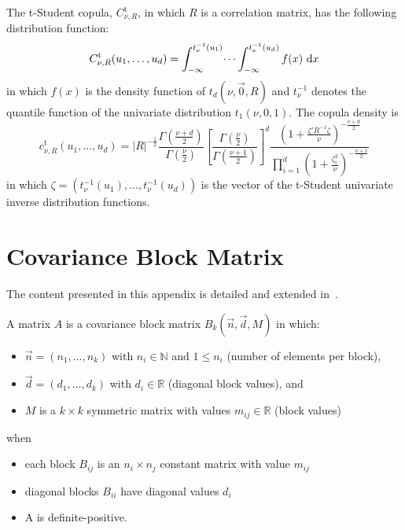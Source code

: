 \documentclass[11pt,fleqn]{book} %
\begin{document}
\begin{proposition}
	The t-Student copula, $C_{\nu,R}^{\text{t}}$, in which $R$ is a 
	correlation matrix, has the following distribution function:
	\begin{displaymath}
		C_{\nu,R}^{\text{t}}(u_1, \dots, u_d) = 
		\int_{-\infty}^{t_\nu^{-1}(u_1)} \dots \int_{-\infty}^{t_\nu^{-1}(u_d)} f(x) \mathop{\,\mathrm{{}d}}\mathopen{} x
	\end{displaymath}
	in which $f(x)$ is the density function of $t_d(\nu,\vec{0},R)$ and 
	$t_{\nu}^{-1}$ denotes the quantile function of the univariate distribution 
	$t_1(\nu,0,1)$. The copula density is
	\begin{displaymath}
		\label{eq:density}
		c_{\nu,R}^{\text{t}}(u_1,\dots,u_d) =
		|R|^{-\frac{1}{2}} 
		\displaystyle\frac{\Gamma{\left(\frac{\nu+d}{2}\right)}}{\Gamma{\left(\frac{\nu}{2}\right)}}
		\displaystyle\left[ \frac{\Gamma{\left(\frac{\nu}{2}\right)}}{\Gamma{\left(\frac{\nu+1}{2}\right)}} \right]^d
		\frac{\displaystyle\left( 1+\frac{\zeta' R^{-1} \zeta}{\nu}\right)^{-\frac{\nu+d}{2}}}{\displaystyle\prod_{i=1}^d \left( 1+\frac{\zeta_i^2}{\nu} \right)^{-\frac{\nu+1}{2}}}
	\end{displaymath}
	\noindent
	in which $\zeta=(t_\nu^{-1}(u_1), \dots, t_\nu^{-1}(u_d))$ is the vector 
	of the t-Student univariate inverse distribution functions.
\end{proposition}

\section{Covariance Block Matrix}
\label{ap:cbm}

The content presented in this appendix is detailed and extended 
in~\cite{torrent:2011}.

\begin{definition}
	A matrix $A$ is a covariance block matrix $B_k(\vec{n},\vec{d},M)$
	in which:
	\begin{itemize}
		\item $\vec{n}=(n_1,\dots,n_k)$ with $n_i \in \mathbb{N}$ and $1 \le n_i$ (number of elements per block),
		\item $\vec{d}=(d_1,\dots,d_k)$ with $d_i \in \mathbb{R}$ (diagonal block values), and
		\item $M$ is a $k {\times} k$ symmetric matrix with values $m_{ij} \in \mathbb{R}$ (block values)
	\end{itemize}
	when
	\begin{itemize}
		\item each block $B_{ij}$ is an $n_i {\times} n_j$ constant matrix with value $m_{ij}$
		\item diagonal blocks $B_{ii}$ have diagonal values $d_i$
		\item A is definite-positive.
	\end{itemize}
\end{definition}
\end{document}
